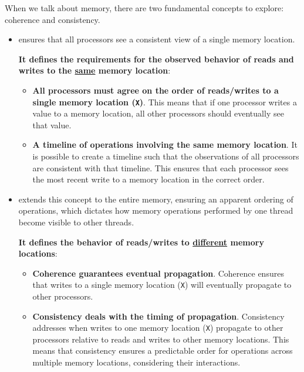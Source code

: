 \highspace
When we talk about memory, there are two fundamental concepts to explore: coherence and consistency.
\begin{itemize}
    \item {} ensures that all processors see a consistent view of a single memory location.
    
    \textbf{It defines the requirements for the observed behavior of reads and writes to the \underline{same} memory location}:
    \begin{itemize}
        \item \textbf{All processors must agree on the order of reads/writes to a single memory location (\texttt{X})}. This means that if one processor writes a value to a memory location, all other processors should eventually see that value.
        
        \item \textbf{A timeline of operations involving the same memory location}. It is possible to create a timeline such that the observations of all processors are consistent with that timeline. This ensures that each processor sees the most recent write to a memory location in the correct order.
    \end{itemize}


    \item {} extends this concept to the entire memory, ensuring an apparent ordering of operations, which dictates how memory operations performed by one thread become visible to other threads.
    
    \textbf{It defines the behavior of reads/writes to \underline{different} memory locations}:
    \begin{itemize}
        \item \textbf{Coherence guarantees eventual propagation}. Coherence ensures that writes to a single memory location (\texttt{X}) will eventually propagate to other processors.
        
        \item \textbf{Consistency deals with the timing of propagation}. Consistency addresses when writes to one memory location (\texttt{X}) propagate to other processors relative to reads and writes to other memory locations. This means that consistency ensures a predictable order for operations across multiple memory locations, considering their interactions.
    \end{itemize}
\end{itemize}

